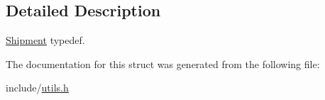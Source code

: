 \subsection{Detailed Description}
\hyperlink{structShipment}{Shipment} typedef. 

The documentation for this struct was generated from the following file\+:\begin{DoxyCompactItemize}
\item 
include/\hyperlink{utils_8h}{utils.\+h}\end{DoxyCompactItemize}
